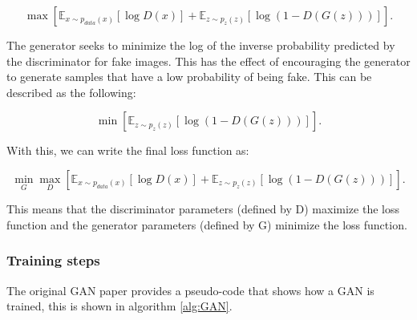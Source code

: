 \begin{equation}
    \max [\mathbb{E}_{x\sim p_{data}(x)}[\log{D(x)}]+\mathbb{E}_{z\sim p_{z}(z)}[\log{(1-D(G(z)))}]].
    \label{eq:GAN}
\end{equation}

The generator seeks to minimize the log of the inverse probability predicted by the discriminator for fake images. This has the effect of encouraging the generator to generate samples that have a low probability of being fake. This can be described as the following:

\begin{equation}
    \min [\mathbb{E}_{z\sim p_{z}(z)}[\log{(1-D(G(z)))}]].
\end{equation}

With this, we can write the final loss function as:

\begin{equation}
   \min_{G} \max_{D} [\mathbb{E}_{x\sim p_{data}(x)}[\log{D(x)}]+\mathbb{E}_{z\sim p_{z}(z)}[\log{(1-D(G(z)))}]].
\end{equation}

This means that the discriminator parameters (defined by D) maximize the loss function and the generator parameters (defined by G) minimize the loss function.

\subsubsection*{Training steps} 

The original \ac{GAN} paper provides a pseudo-code that shows how a \ac{GAN} is trained, this is shown in algorithm \ref{alg:GAN}.

